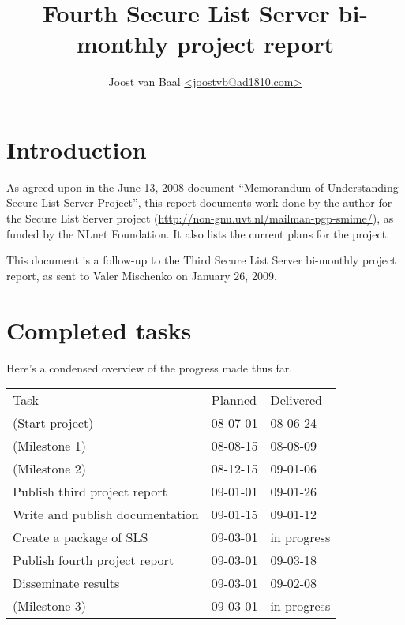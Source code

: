 \documentclass[a4]{article}
\title{Fourth Secure List Server bi-monthly project report}
\author{Joost van Baal \url{<joostvb@ad1810.com>}}
\begin{document}
\maketitle

\setlength{\parindent}{0pt}
\setlength{\parskip}{1.5ex}

\section*{Introduction}

As agreed upon in the June 13, 2008 document ``Memorandum of Understanding
Secure List Server Project'', this report documents work done by the author for
the Secure List Server project
(\url{http://non-gnu.uvt.nl/mailman-pgp-smime/}), as funded by the NLnet
Foundation.  It also lists the current plans for the project.

This document is a follow-up to the Third Secure List Server bi-monthly
project report, as sent to Valer Mischenko on January 26, 2009.


\section{Completed tasks}

Here's a condensed overview of the progress made thus far.

\begin{tabular}{lll}
 Task                            & Planned  & Delivered   \\ \cline{1-3}
 (Start project)                 & 08-07-01 & 08-06-24    \\
 (Milestone 1)                   & 08-08-15 & 08-08-09    \\
 (Milestone 2)                   & 08-12-15 & 09-01-06    \\
 Publish third project report    & 09-01-01 & 09-01-26    \\
 Write and publish documentation & 09-01-15 & 09-01-12    \\
 Create a package of SLS         & 09-03-01 & in progress \\
 Publish fourth project report   & 09-03-01 & 09-03-18    \\
 Disseminate results             & 09-03-01 & 09-02-08    \\
 (Milestone 3)                   & 09-03-01 & in progress \\
\end{tabular}
\end{document}
